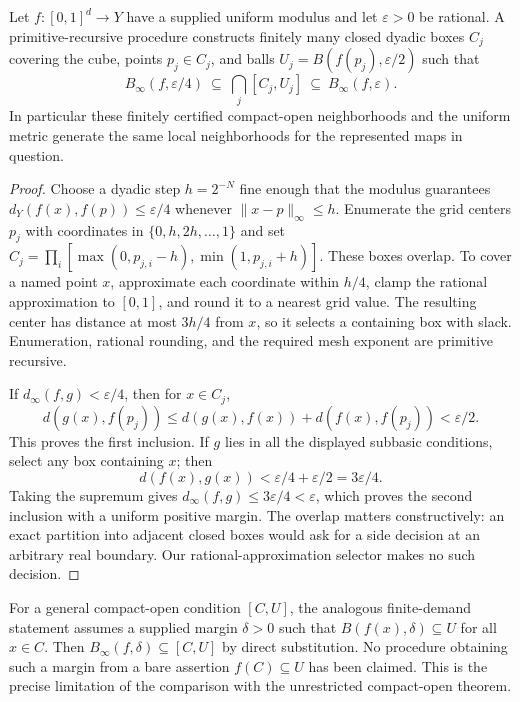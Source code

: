 \begin{theorem}\label{thm:compact-open-cube}
Let $f:[0,1]^d\to Y$ have a supplied uniform modulus and let
$\varepsilon>0$ be rational.  A primitive-recursive procedure constructs
finitely many closed dyadic boxes $C_j$ covering the cube, points
$p_j\in C_j$, and balls
$U_j=B(f(p_j),\varepsilon/2)$ such that
\begin{equation}\label{eq:compact-open-sandwich}
 B_{\infty}(f,\varepsilon/4)
 \ \subseteq\ \bigcap_j[C_j,U_j]
 \ \subseteq\ B_{\infty}(f,\varepsilon).
\end{equation}
In particular these finitely certified compact-open neighborhoods
and the uniform metric generate the same local neighborhoods for the
represented maps in question.
\end{theorem}
\begin{proof}
Choose a dyadic step $h=2^{-N}$ fine enough that the modulus guarantees
$d_Y(f(x),f(p))\leq\varepsilon/4$ whenever
$\|x-p\|_\infty\leq h$.  Enumerate the grid centers $p_j$ with
coordinates in $\{0,h,2h,\ldots,1\}$ and set
$C_j=\prod_i[\max(0,p_{j,i}-h),\min(1,p_{j,i}+h)]$.
These boxes overlap.  To cover a named point $x$, approximate each
coordinate within $h/4$, clamp the rational approximation to $[0,1]$,
and round it to a nearest grid value.  The resulting center has distance
at most $3h/4$ from $x$, so it selects a containing box with slack.
Enumeration, rational rounding, and the required mesh exponent are
primitive recursive.

If $d_\infty(f,g)<\varepsilon/4$, then for $x\in C_j$,
\[
 d(g(x),f(p_j))
 \leq d(g(x),f(x))+d(f(x),f(p_j))<\varepsilon/2.
\]
This proves the first inclusion.  If $g$ lies in all the displayed
subbasic conditions, select any box containing $x$; then
\[
 d(f(x),g(x))<\varepsilon/4+\varepsilon/2=3\varepsilon/4.
\]
Taking the supremum gives $d_\infty(f,g)\leq3\varepsilon/4<\varepsilon$,
which proves the second inclusion with a uniform positive margin.
The overlap matters constructively: an exact partition into adjacent
closed boxes would ask for a side decision at an arbitrary real boundary.
Our rational-approximation selector makes no such decision.
\end{proof}

For a general compact-open condition $[C,U]$, the analogous finite-demand
statement assumes a supplied margin $\delta>0$ such that
$B(f(x),\delta)\subseteq U$ for all $x\in C$.  Then
$B_\infty(f,\delta)\subseteq[C,U]$ by direct substitution.
No procedure obtaining such a margin from a bare assertion
$f(C)\subseteq U$ has been claimed.  This is the precise limitation of
the comparison with the unrestricted compact-open theorem.

